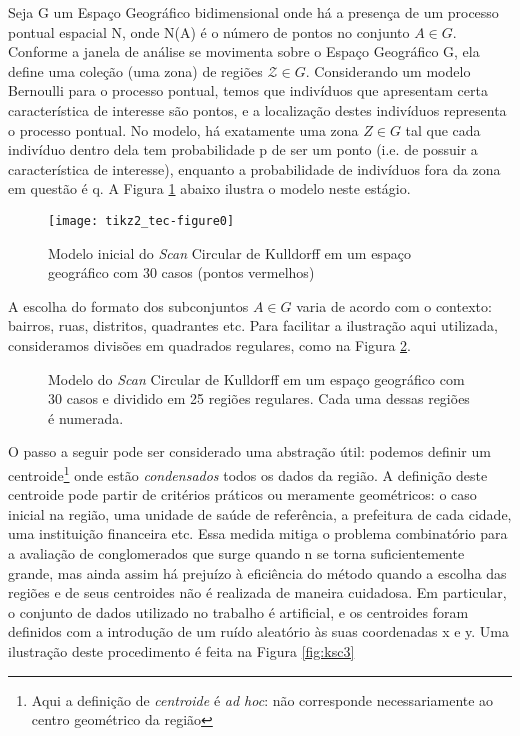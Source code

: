 \documentclass[
	12pt,				%
	openright,			%
	twoside,			%
	a4paper,			%
	english,			%
	brazil,				%
	]{abntex2}
\begin{document}
Seja G um Espaço Geográfico bidimensional onde há a presença de um processo pontual espacial N, onde N(A) é o número de pontos no conjunto $A \in G$. Conforme a janela de análise se movimenta sobre o Espaço Geográfico G, ela define uma coleção (uma zona) de regiões $\mathcal{Z} \in G$. Considerando um modelo Bernoulli para o processo pontual, temos que indivíduos que apresentam certa característica de interesse são pontos, e a localização destes indivíduos representa o processo pontual. No modelo, há exatamente uma zona $Z \in G$ tal que cada indivíduo dentro dela tem probabilidade p de ser um ponto (i.e. de possuir a característica de interesse), enquanto a probabilidade de indivíduos fora da zona em questão é q. A Figura \ref{fig:ksc1} abaixo ilustra o modelo neste estágio.

\begin{figure}
\centering
\texttt{[image: tikz2\_tec-figure0]}
\caption{Modelo inicial do \textit{Scan} Circular de Kulldorff em um espaço geográfico com 30 casos (pontos vermelhos)} \label{fig:ksc1}
\end{figure}

A escolha do formato dos subconjuntos $A \in G$ varia de acordo com o contexto: bairros, ruas, distritos, quadrantes etc. Para facilitar a ilustração aqui utilizada, consideramos divisões em quadrados regulares, como na Figura \ref{fig:ksc2}. 

\begin{figure}
\centering
{}
\caption{Modelo do \textit{Scan} Circular de Kulldorff em um espaço geográfico com 30 casos e dividido em 25 regiões regulares. Cada uma dessas regiões é numerada.} \label{fig:ksc2}
\end{figure}

O passo a seguir pode ser considerado uma abstração útil: podemos definir um centroide\footnote{Aqui a definição de \textit{centroide} é \textit{ad hoc}: não corresponde necessariamente ao centro geométrico da região} onde estão \textit{condensados} todos os dados da região. A definição deste centroide pode partir de critérios práticos ou meramente geométricos: o caso inicial na região, uma unidade de saúde de referência, a prefeitura de cada cidade, uma instituição financeira etc. Essa medida mitiga o problema combinatório para a avaliação de conglomerados que surge quando n se torna suficientemente grande, mas ainda assim há prejuízo à eficiência do método quando a escolha das regiões e de seus centroides não é realizada de maneira cuidadosa. Em particular, o conjunto de dados utilizado no trabalho é artificial, e os centroides foram definidos com a introdução de um ruído aleatório às suas coordenadas x e y. Uma ilustração deste procedimento é feita na Figura \ref{fig:ksc3}
\end{document}
